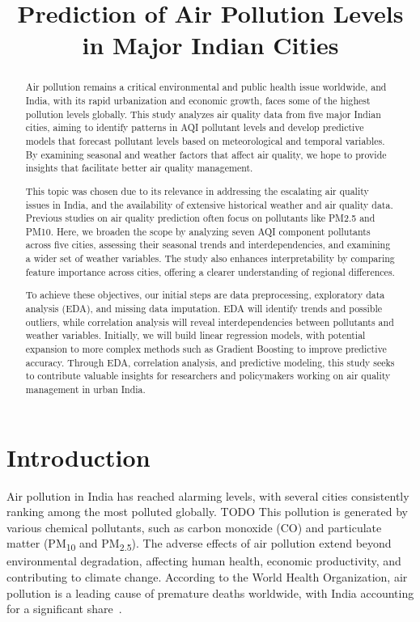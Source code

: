 \documentclass[12pt]{article}
\title{Prediction of Air Pollution Levels in Major Indian Cities}
\author{}
\date{}
\begin{document}
\maketitle


\begin{abstract}
Air pollution remains a critical environmental and public health issue worldwide, and India, with its rapid urbanization and economic growth, faces some of the highest pollution levels globally. This study analyzes air quality data from five major Indian cities, aiming to identify patterns in AQI pollutant levels and develop predictive models that forecast pollutant levels based on meteorological and temporal variables. By examining seasonal and weather factors that affect air quality, we hope to provide insights that facilitate better air quality management.

This topic was chosen due to its relevance in addressing the escalating air quality issues in India, and the availability of extensive historical weather and air quality data.
Previous studies on air quality prediction often focus on pollutants like PM2.5 and PM10. Here, we broaden the scope by analyzing seven AQI component pollutants across five cities, assessing their seasonal trends and interdependencies, and examining a wider set of weather variables. The study also enhances interpretability by comparing feature importance across cities, offering a clearer understanding of regional differences.

To achieve these objectives, our initial steps are data preprocessing, exploratory data analysis (EDA), and missing data imputation. EDA will identify trends and possible outliers, while correlation analysis will reveal interdependencies between pollutants and weather variables. Initially, we will build linear regression models, with potential expansion to more complex methods such as Gradient Boosting to improve predictive accuracy. Through EDA, correlation analysis, and predictive modeling, this study seeks to contribute valuable insights for researchers and policymakers working on air quality management in urban India.
\end{abstract}

\tableofcontents

\newpage

\section{Introduction}

Air pollution in India has reached alarming levels, with several cities consistently ranking among the most polluted globally. TODO This pollution is generated by various chemical pollutants, such as carbon monoxide (CO) and particulate matter (PM\textsubscript{10} and PM\textsubscript{2.5}). The adverse effects of air pollution extend beyond environmental degradation, affecting human health, economic productivity, and contributing to climate change. According to the World Health Organization, air pollution is a leading cause of premature deaths worldwide, with India accounting for a significant share~\cite{Dey2020}.
\end{document}
